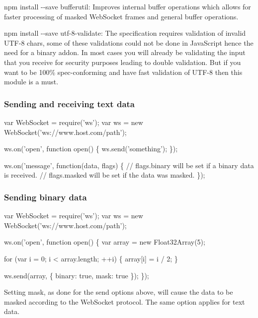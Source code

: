 \begin{DoxyItemize}
\item {\ttfamily npm install -\/-\/save bufferutil}\+: Improves internal buffer operations which allows for faster processing of masked Web\+Socket frames and general buffer operations.
\item {\ttfamily npm install -\/-\/save utf-\/8-\/validate}\+: The specification requires validation of invalid U\+T\+F-\/8 chars, some of these validations could not be done in Java\+Script hence the need for a binary addon. In most cases you will already be validating the input that you receive for security purposes leading to double validation. But if you want to be 100\% spec-\/conforming and have fast validation of U\+T\+F-\/8 then this module is a must.
\end{DoxyItemize}

\subsubsection*{Sending and receiving text data}


\begin{DoxyCode}
var WebSocket = require('ws');
var ws = new WebSocket('ws://www.host.com/path');

ws.on('open', function open() \{
  ws.send('something');
\});

ws.on('message', function(data, flags) \{
  // flags.binary will be set if a binary data is received.
  // flags.masked will be set if the data was masked.
\});
\end{DoxyCode}


\subsubsection*{Sending binary data}


\begin{DoxyCode}
var WebSocket = require('ws');
var ws = new WebSocket('ws://www.host.com/path');

ws.on('open', function open() \{
  var array = new Float32Array(5);

  for (var i = 0; i < array.length; ++i) \{
    array[i] = i / 2;
  \}

  ws.send(array, \{ binary: true, mask: true \});
\});
\end{DoxyCode}


Setting {\ttfamily mask}, as done for the send options above, will cause the data to be masked according to the Web\+Socket protocol. The same option applies for text data.

